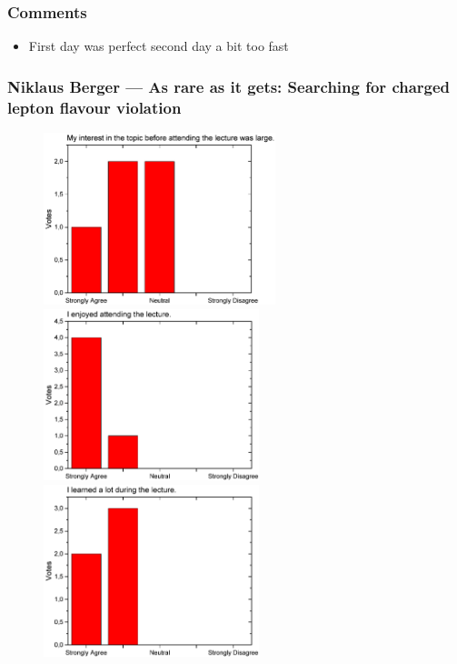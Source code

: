 \subsubsection*{Comments}
\begin{itemize}
\item First day was perfect second day a bit too fast
\end{itemize}
\newpage

\subsubsection{Niklaus Berger  --- As rare as it gets: Searching for charged lepton flavour violation }
\begin{figure}[h!]
  \centering
  \begin{minipage}{.48\linewidth}
    \centering
      {\includegraphics[height=50mm]{figures/n/Graph101.pdf}}
      {\includegraphics[height=50mm]{figures/n/Graph102.pdf}}
      {\includegraphics[height=50mm]{figures/n/Graph103.pdf}}

\end{minipage}
\end{figure}
